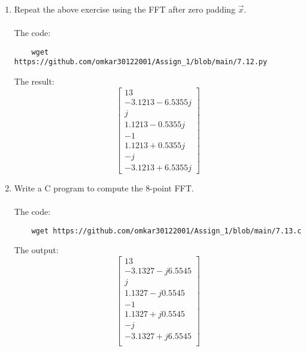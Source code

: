 \documentclass[journal,12pt,twocolumn]{IEEEtran}
\renewcommand\thesection{\arabic{section}}
\begin{document}
\begin{enumerate}[label=\thesection.\arabic*
	,ref=\thesection.\theenumi]
\begin{enumerate}[label=\arabic*.,ref=\thesection.\theenumi]
\begin{align}
	\end{align}
	\begin{align}
		=\myvec{13\\-4 - \sqrt{3}j\\ 1\\-1\\1\\-4 + \sqrt{3}j}
	\end{align}
	\item Repeat the above exercise using the FFT
	after zero padding $\vec{x}$. \\
	\solution \\
	The code:
	\begin{lstlisting}
	wget https://github.com/omkar30122001/Assign_1/blob/main/7.12.py
	\end{lstlisting}
	The result:
	\begin{equation}
		\begin{bmatrix}
			13\\
			-3.1213-6.5355j\\
			j\\
			1.1213-0.5355j\\
			-1\\
			1.1213+0.5355j\\
			-j\\
			-3.1213+6.5355j
		\end{bmatrix}
	\end{equation}
	\item Write a C program to compute the 8-point FFT. \\
	\solution \\
	The code:
	\begin{lstlisting}
	wget https://github.com/omkar30122001/Assign_1/blob/main/7.13.c
	\end{lstlisting}
The output:
\begin{equation}
	\begin{bmatrix}
		13\\
		-3.1327 - j6.5545\\
		j\\
		1.1327 - j0.5545\\
		-1\\
		1.1327 + j0.5545\\
		- j\\
		-3.1327 + j6.5545\\
	\end{bmatrix}
\end{equation}
\end{enumerate}

\end{enumerate}
\end{document}
